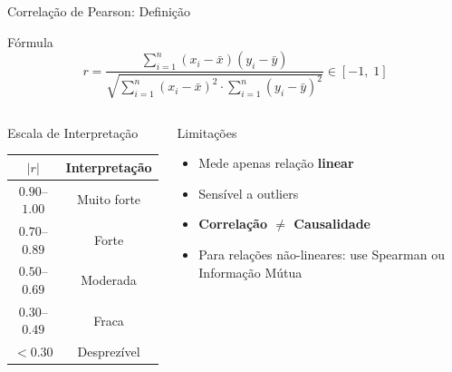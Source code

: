\documentclass[aspectratio=169]{beamer}
\begin{document}
\begin{frame}{Correlação de Pearson: Definição}
    \begin{block}{Fórmula}
        \[
          r = \frac{\sum_{i=1}^{n}(x_i-\bar{x})(y_i-\bar{y})}
                   {\sqrt{\sum_{i=1}^{n}(x_i-\bar{x})^2 \cdot \sum_{i=1}^{n}(y_i-\bar{y})^2}}
          \in [-1,\;1]
        \]
    \end{block}
    \pause
    \begin{columns}
        \begin{block}{Escala de Interpretação}
            \begin{center}\footnotesize
            \begin{tabular}{cc}
            \toprule
            $|r|$ & Interpretação \\
            \midrule
            $0{.}90$--$1{.}00$ & Muito forte \\
            $0{.}70$--$0{.}89$ & Forte \\
            $0{.}50$--$0{.}69$ & Moderada \\
            $0{.}30$--$0{.}49$ & Fraca \\
            $< 0{.}30$        & Desprezível \\
            \bottomrule
            \end{tabular}
            \end{center}
        \end{block}
        \pause
        \begin{alertblock}{Limitações}
            \footnotesize
            \begin{itemize}
                \item Mede apenas relação \textbf{linear}
                \item Sensível a outliers
                \item \textbf{Correlação $\neq$ Causalidade}
                \item Para relações não-lineares: use Spearman ou Informação Mútua
            \end{itemize}
        \end{alertblock}
    \end{columns}
\end{frame}
\end{document}
